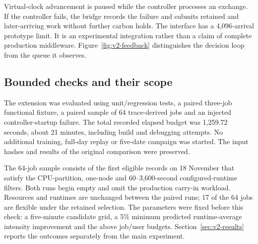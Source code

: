 Virtual-clock advancement is paused while the controller processes an exchange. If the controller fails, the bridge records the failure and submits retained and later-arriving work without further carbon holds. The interface has a 4,096-arrival prototype limit. It is an experimental integration rather than a claim of complete production middleware. Figure~\ref{fig:v2-feedback} distinguishes the decision loop from the queue it observes.

\FloatBarrier

\subsection{Bounded checks and their scope}
The extension was evaluated using unit/regression tests, a paired three-job functional fixture, a paired sample of 64 trace-derived jobs and an injected controller-startup failure. The total recorded elapsed budget was 1,259.72 seconds, about 21 minutes, including build and debugging attempts. No additional training, full-day replay or five-date campaign was started. The input hashes and results of the original comparison were preserved.

The 64-job sample consists of the first eligible records on 18 November that satisfy the CPU-partition, one-node and 60--3,600-second configured-runtime filters. Both runs begin empty and omit the production carry-in workload. Resources and runtimes are unchanged between the paired runs; 17 of the 64 jobs are flexible under the retained selection. The parameters were fixed before this check: a five-minute candidate grid, a 5\% minimum predicted runtime-average intensity improvement and the above job/user budgets. Section~\ref{sec:v2-results} reports the outcomes separately from the main experiment.
